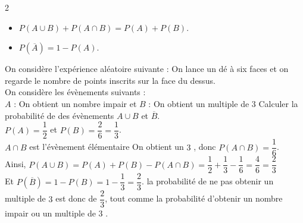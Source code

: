 \begin{minipage}[c]{0.3\linewidth}
\begin{center}  
\end{center}

\end{minipage}


\begin{Théorème}
\leavevmode\vspace{-\baselineskip}
\begin{multicols}{2}
\begin{itemize}[label=\textcolor{Couleur1}{$\bullet$}]
\item $P(A\cup B)+P(A\cap B)=P(A)+P(B)$.
\item $P(\overline{A})=1-P(A)$.
\end{itemize}
\end{multicols}
\end{Théorème}

\begin{Exemple}
On considère l'expérience aléatoire suivante :
On lance un dé à six faces et on regarde le nombre de points inscrits sur la face du dessus.\\
On considère les évènements suivants :\\
$A$ : \og On obtient un nombre impair \fg{}
et $B$ : \og On obtient un multiple de $3$ \fg{}
Calculer la probabilité de des évènements $A\cup B$ et $\overline{B}$.\\

\noindent $P(A)=\dfrac{1}{2}$ et $P(B)=\dfrac{2}{6}=\dfrac{1}{3}$.\\
$A\cap B$ est l'évènement élémentaire \og On obtient un $3$ \fg{}, donc $P(A\cap B)=\dfrac{1}{6}$.\\
Ainsi, $P(A\cup B)=P(A)+P(B)-P(A\cap B)=\dfrac{1}{2}+\dfrac{1}{3}-\dfrac{1}{6}=\dfrac{4}{6}=\dfrac{2}{3}$\\
Et $P(\overline{B})=1-P(B)=1-\dfrac{1}{3}=\dfrac{2}{3}$. la probabilité de ne pas obtenir un multiple de $3$ est donc de $\dfrac{2}{3}$, tout comme la probabilité d'\og obtenir un nombre impair ou un multiple de $3$ \fg{}.

\end{Exemple}

